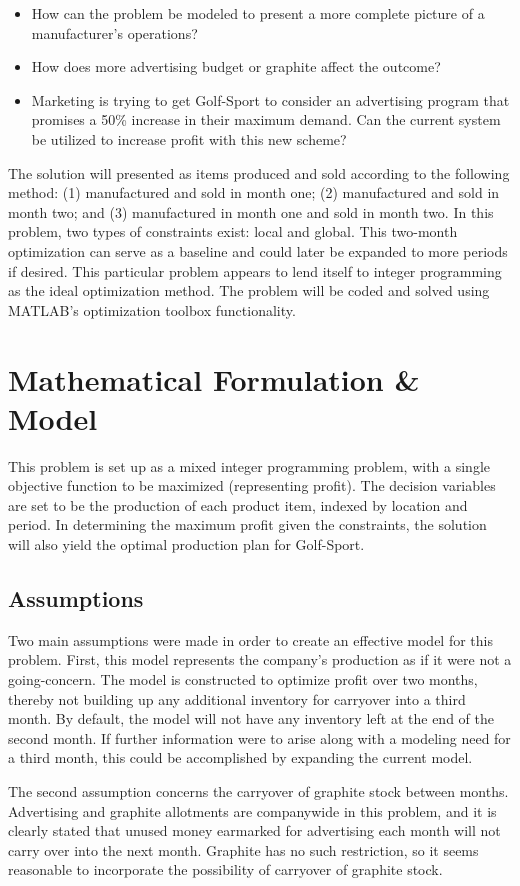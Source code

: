 \documentclass{article}
\begin{document}
\begin{itemize}
	\item How can the problem be modeled to present a more complete picture of a manufacturer’s operations?
	\item How does more advertising budget or graphite affect the outcome?
	\item Marketing is trying to get Golf-Sport to consider an advertising program that promises a 50\% increase in their maximum demand. Can the current system be utilized to increase profit with this new scheme?
\end{itemize}
\par
The solution will presented as items produced and sold according to the following method: (1) manufactured and sold in month one; (2) manufactured and sold in month two; and (3) manufactured in month one and sold in month two. In this problem, two types of constraints exist: local and global. This two-month optimization can serve as a baseline and could later be expanded to more periods if desired. This particular problem appears to lend itself to integer programming as the ideal optimization method. The problem will be coded and solved using MATLAB's optimization toolbox functionality.
\section{Mathematical Formulation \& Model}
This problem is set up as a mixed integer programming problem, with a single objective function to be maximized (representing profit).  
The decision variables are set to be the production of each product item, indexed by location and period.  In determining the maximum profit given the constraints, 
the solution will also yield the optimal production plan for Golf-Sport.
\subsection{Assumptions}
Two main assumptions were made in order to create an effective model for this problem.  First, this model represents the company's production as if it were not a 
going-concern.  The model is constructed to optimize profit over two months, thereby not building up any additional inventory for carryover into 
a third month.  By default, the model will not have any inventory left at the end of the second month.  If further information were to arise along with 
a modeling need for a third month, this could be accomplished by expanding the current model.
\par
The second assumption concerns the carryover of graphite stock between months.  Advertising and graphite allotments are companywide in this problem, and 
it is clearly stated that unused money earmarked for advertising each month will not carry over into the next month.  Graphite has no such restriction, so 
it seems reasonable to incorporate the possibility of carryover of graphite stock.
\end{document}
